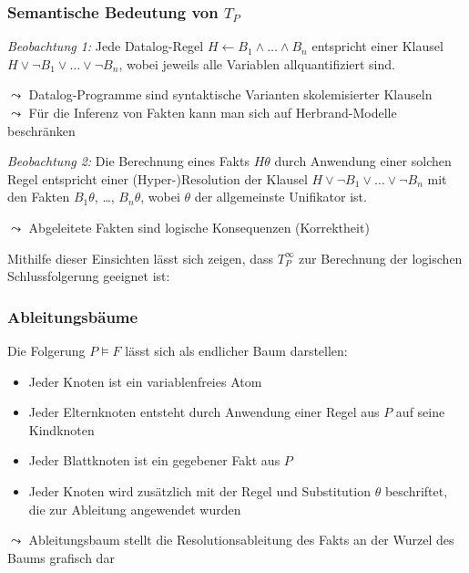 \documentclass[aspectratio=1610,onlymath]{beamer}
\begin{document}
\begin{frame}\frametitle{Semantische Bedeutung von $T_P$}

\emph{Beobachtung 1:} Jede Datalog-Regel $H\leftarrow B_1\wedge\ldots\wedge B_n$ entspricht einer
Klausel $H\vee\neg B_1\vee\ldots\vee\neg B_n$, wobei jeweils alle Variablen allquantifiziert sind.
\medskip\pause

$\leadsto$ Datalog-Programme sind syntaktische Varianten skolemisierter Klauseln\\
$\leadsto$ Für die Inferenz von Fakten kann man sich auf Herbrand-Modelle beschränken\bigskip\pause

\emph{Beobachtung 2:} Die Berechnung eines Fakts $H\theta$ durch Anwendung einer solchen Regel entspricht einer (Hyper-)Resolution der Klausel $H\vee\neg B_1\vee\ldots\vee\neg B_n$ mit den Fakten $B_1\theta$, \ldots, $B_n\theta$, wobei $\theta$ der allgemeinste Unifikator ist.\medskip\pause

$\leadsto$ Abgeleitete Fakten sind logische Konsequenzen (Korrektheit)\bigskip\pause

Mithilfe dieser Einsichten lässt sich zeigen, dass $T_P^\infty$ zur Berechnung der logischen Schlussfolgerung geeignet ist:


\end{frame}

\begin{frame}\frametitle{Ableitungsbäume}

Die Folgerung $P\models F$ lässt sich als endlicher Baum darstellen:
\begin{itemize}
\item Jeder Knoten ist ein variablenfreies Atom
\item Jeder Elternknoten entsteht durch Anwendung einer Regel aus $P$ auf seine Kindknoten
\item Jeder Blattknoten ist ein gegebener Fakt aus $P$
\item Jeder Knoten wird zusätzlich mit der Regel und Substitution $\theta$ beschriftet, die zur Ableitung angewendet wurden
\end{itemize}
$\leadsto$ Ableitungsbaum stellt die Resolutionsableitung des Fakts an der Wurzel des Baums grafisch dar
\bigskip


\end{frame}
\end{document}

